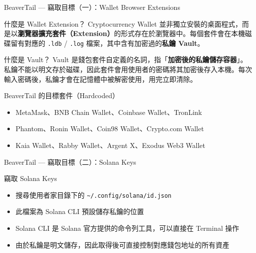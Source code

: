 \documentclass{beamer}
\begin{document}
\begin{frame}{BeaverTail — 竊取目標（一）：Wallet Browser Extensions}
  \begin{block}{什麼是 Wallet Extension？}
    \small
    Cryptocurrency Wallet 並非獨立安裝的桌面程式，而是以\textbf{瀏覽器擴充套件（Extension）}的形式存在於瀏覽器中。每個套件會在本機磁碟留有對應的 \texttt{.ldb} / \texttt{.log} 檔案，其中含有加密過的\textbf{私鑰 Vault}。
  \end{block}

  \begin{block}{什麼是 Vault？}
    \small
    Vault 是錢包套件自定義的名詞，指「\textbf{加密後的私鑰儲存容器}」。私鑰不能以明文存於磁碟，因此套件會用使用者的密碼將其加密後存入本機。每次輸入密碼後，私鑰才會在記憶體中被解密使用，用完立即清除。
  \end{block}

  \begin{block}{BeaverTail 的目標套件（Hardcoded）}
    \small
    \begin{itemize}
      \item MetaMask、BNB Chain Wallet、Coinbase Wallet、TronLink
      \item Phantom、Ronin Wallet、Coin98 Wallet、Crypto.com Wallet
      \item Kaia Wallet、Rabby Wallet、Argent X、Exodus Web3 Wallet
    \end{itemize}
  \end{block}
\end{frame}

\begin{frame}{BeaverTail — 竊取目標（二）：Solana Keys}
  \begin{block}{竊取 Solana Keys}
    \begin{itemize}
      \item 搜尋使用者家目錄下的 \texttt{\~{}/.config/solana/id.json}
      \item 此檔案為 Solana CLI 預設儲存私鑰的位置
      \item Solana CLI 是 Solana 官方提供的命令列工具，可以直接在 Terminal 操作
      \item 由於私鑰是明文儲存，因此取得後可直接控制對應錢包地址的所有資產
    \end{itemize}
  \end{block}
\end{frame}
\end{document}
